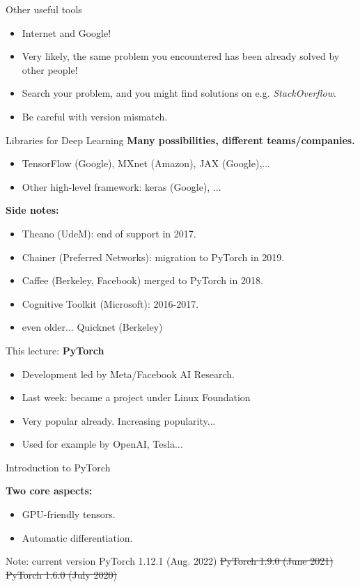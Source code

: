 \begin{frame}{Other useful tools}
\begin{itemize}
\item Internet and Google!
\item Very likely, the same problem you encountered has been already solved by other people!
\item Search your problem, and you might find solutions on e.g. \textit{StackOverflow}.
\item Be careful with version mismatch.
\end{itemize}
\end{frame}

\begin{frame}{Libraries for Deep Learning}
\vspace{-3mm}
\textbf{Many possibilities, different teams/companies.}
\begin{itemize}
\item TensorFlow (Google), MXnet (Amazon), JAX (Google),...
\item Other high-level framework: keras (Google), ...
\end{itemize}
\pause
\vsp
\textbf{Side notes:}
\begin{itemize}
\item Theano (UdeM): end of support in 2017.
\item Chainer (Preferred Networks): migration to PyTorch in 2019.
\item Caffee (Berkeley, Facebook) merged to PyTorch in 2018. 
\item Cognitive Toolkit (Microsoft): 2016-2017.
\item even older... Quicknet (Berkeley)
\end{itemize}
\pause
\vsp
This lecture: \textbf{PyTorch}
\begin{itemize}
\item Development led by Meta/Facebook AI Research.
\item Last week: became a project under Linux Foundation
\item Very popular already. Increasing popularity...
\item Used for example by OpenAI, Tesla...
\end{itemize}
\end{frame}

\begin{frame}[fragile]{Introduction to PyTorch}

\textbf{Two core aspects:}
\vsp
\begin{itemize}
\item GPU-friendly tensors.
\item Automatic differentiation.
\end{itemize}
\vsp
Note: current version PyTorch 1.12.1 (Aug. 2022) \sout{PyTorch 1.9.0 (June 2021)} \sout{PyTorch 1.6.0 (July 2020)} \\
\end{frame}

